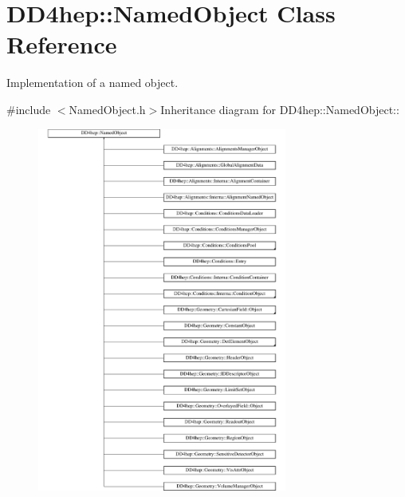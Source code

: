\hypertarget{class_d_d4hep_1_1_named_object}{
\section{DD4hep::NamedObject Class Reference}
\label{class_d_d4hep_1_1_named_object}
}


Implementation of a named object.  


{\ttfamily \#include $<$NamedObject.h$>$}Inheritance diagram for DD4hep::NamedObject::\begin{figure}[H]
\begin{center}
\leavevmode
\includegraphics[height=12cm]{class_d_d4hep_1_1_named_object}
\end{center}
\end{figure}
